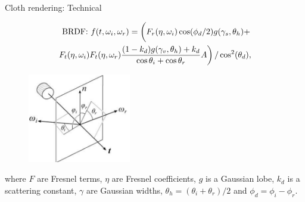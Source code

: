 \documentclass{beamer}
\begin{document}
\begin{frame}{Cloth rendering: Technical}

\begin{equation*} 
\begin{split}
\mbox{BRDF: } f(t, \omega_i, \omega_r) = \left( \vphantom{\int} F_r(\eta, \omega_i) \cos(\phi_d/2)g(\gamma_s, \theta_h) + \right. \\ 
 \left. F_t(\eta, \omega_i) F_t(\eta, \omega_r) \frac{(1-k_d)g(\gamma_v, \theta_h)+k_d}{\cos \theta_i + \cos \theta_r} A \right) / \cos^2(\theta_d),
\end{split}
\end{equation*}

\begin{multicols}{2}
\begin{figure}[b!]
\includegraphics[width=0.4\textwidth]{img/cloth_directions}
\end{figure}

\vfill
\columnbreak
\vspace*{\fill}
\small{where $F$ are Fresnel terms, $\eta$ are Fresnel coefficients, $g$ is a Gaussian lobe, $k_d$ is a scattering constant, $\gamma$ are Gaussian widths, $\theta_h = (\theta_i+\theta_r)/2$ and $\phi_d = \phi_i-\phi_r$. }
\end{multicols}

\end{frame}
\end{document}
